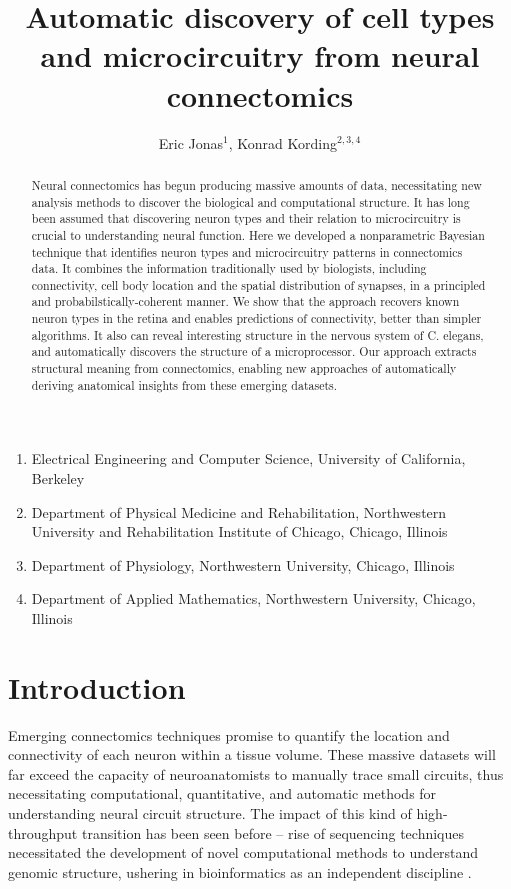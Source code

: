 \documentclass{article}
\title{Automatic discovery of cell types and microcircuitry from neural connectomics}
\author{Eric Jonas$^1$, Konrad Kording$^{2, 3,4}$}
\begin{document}
\maketitle

\begin{small}
\begin{enumerate}
  \item Electrical Engineering and Computer Science, University of California, Berkeley
  \item Department of Physical Medicine and Rehabilitation,
    Northwestern University and Rehabilitation Institute of Chicago,
    Chicago, Illinois
  \item Department of Physiology, Northwestern University, Chicago, Illinois
  \item Department of Applied Mathematics, Northwestern University, Chicago, Illinois
\end{enumerate}
\end{small}

\begin{abstract}
  Neural connectomics has begun producing massive amounts of data,
  necessitating new analysis methods to discover the biological and
  computational structure. It has long been assumed that discovering
  neuron types and their relation to microcircuitry is crucial to
  understanding neural function. Here we developed a nonparametric
  Bayesian technique that identifies neuron types and microcircuitry
  patterns in connectomics data. It combines the information
  traditionally used by biologists, including connectivity, cell body
  location and the spatial distribution of synapses, in a
  principled and probabilstically-coherent manner. We show that the
  approach recovers known neuron types in the retina and enables
  predictions of connectivity, better than simpler algorithms. It also
  can reveal interesting structure in the nervous system of
  C. elegans, and automatically discovers the structure of a
  microprocessor.  Our approach extracts structural meaning from
  connectomics, enabling new approaches of automatically deriving
  anatomical insights from these emerging datasets.
\end{abstract}


\section*{Introduction}
Emerging connectomics techniques \autocite{Morgan2013,Zador2012}
promise to quantify the location and connectivity of each neuron
within a tissue volume. These massive datasets will far exceed the
capacity of neuroanatomists to manually trace small circuits, thus
necessitating computational, quantitative, and automatic methods for
understanding neural circuit structure.  The impact of this kind of
high-throughput transition has been seen before -- rise of sequencing
techniques necessitated the development of novel computational methods
to understand genomic structure, ushering in  bioinformatics
as an independent discipline \autocite{Koboldt2013}.
\end{document}
